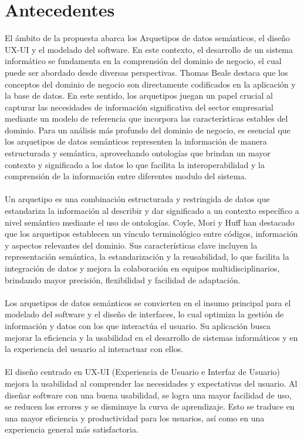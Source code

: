 \documentclass[12pt,a4paper]{article}
\begin{document}
\section{Antecedentes}
\label{sec:5}
El ámbito de la propuesta abarca los Arquetipos de datos semánticos, el diseño UX-UI y el modelado del software. En este contexto, el desarrollo de un sistema informático se fundamenta en la comprensión del dominio de negocio, el cual puede ser abordado desde diversas perspectivas. Thomas Beale destaca que los conceptos del dominio de negocio son directamente codificados en la aplicación y la base de datos. En este sentido, los arquetipos juegan un papel crucial al capturar las necesidades de información significativa del sector empresarial mediante un modelo de referencia que incorpora las características estables del dominio. Para un análisis más profundo del dominio de negocio, es esencial que los arquetipos de datos semánticos representen la información de manera estructurada y semántica, aprovechando ontologías que brindan un mayor contexto y significado a los datos lo que facilita la interoperabilidad y la comprensión de la información entre diferentes modulo del sistema.
\\\\
Un arquetipo es una combinación estructurada y restringida de datos que estandariza la información al describir y dar significado a un contexto específico a nivel semántico mediante el uso de ontologías. Coyle, Mori y Huff han destacado que los arquetipos establecen un vínculo terminológico entre códigos, información y aspectos relevantes del dominio. Sus características clave incluyen la representación semántica, la estandarización y la reusabilidad, lo que facilita la integración de datos y mejora la colaboración en equipos multidisciplinarios, brindando mayor precisión, flexibilidad y facilidad de adaptación. 
\\\\
Los arquetipos de datos semánticos se convierten en el insumo principal para el modelado del software y el diseño de interfaces, lo cual optimiza la gestión de información y datos con los que interactúa el usuario. Su aplicación busca mejorar la eficiencia y la usabilidad en el desarrollo de sistemas informáticos y en la experiencia del usuario al interactuar con ellos. 
\\\\
El diseño centrado en UX-UI (Experiencia de Usuario e Interfaz de Usuario) mejora la usabilidad al comprender las necesidades y expectativas del usuario. Al diseñar software con una buena usabilidad, se logra una mayor facilidad de uso, se reducen los errores y se disminuye la curva de aprendizaje. Esto se traduce en una mayor eficiencia y productividad para los usuarios, así como en una experiencia general más satisfactoria. 
\end{document}
